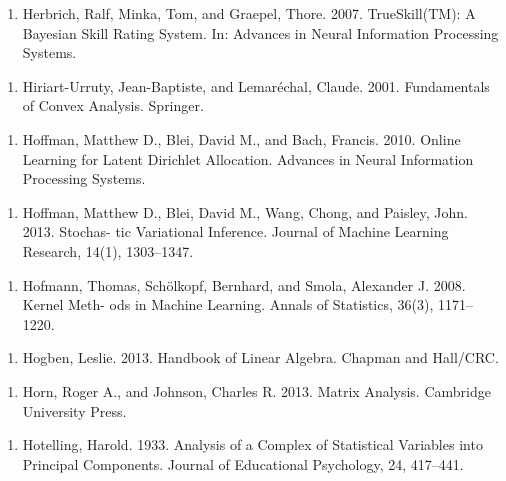 \begin{enumerate}
\item Herbrich, Ralf, Minka, Tom, and Graepel, Thore. 2007. TrueSkill(TM): A Bayesian Skill Rating System. In: Advances in Neural Information Processing Systems.
\end{enumerate}

\begin{enumerate}
\item Hiriart-Urruty, Jean-Baptiste, and Lemaréchal, Claude. 2001. Fundamentals of Convex Analysis. Springer.
\end{enumerate}

\begin{enumerate}
\item Hoffman, Matthew D., Blei, David M., and Bach, Francis. 2010. Online Learning for Latent Dirichlet Allocation. Advances in Neural Information Processing Systems.
\end{enumerate}

\begin{enumerate}
\item Hoffman, Matthew D., Blei, David M., Wang, Chong, and Paisley, John. 2013. Stochas- tic Variational Inference. Journal of Machine Learning Research, 14(1), 1303–1347.
\end{enumerate}

\begin{enumerate}
\item Hofmann, Thomas, Schölkopf, Bernhard, and Smola, Alexander J. 2008. Kernel Meth- ods in Machine Learning. Annals of Statistics, 36(3), 1171–1220.
\end{enumerate}

\begin{enumerate}
\item Hogben, Leslie. 2013. Handbook of Linear Algebra. Chapman and Hall/CRC.
\end{enumerate}

\begin{enumerate}
\item Horn, Roger A., and Johnson, Charles R. 2013. Matrix Analysis. Cambridge University Press.
\end{enumerate}

\begin{enumerate}
\item Hotelling, Harold. 1933. Analysis of a Complex of Statistical Variables into Principal Components. Journal of Educational Psychology, 24, 417–441.
\end{enumerate}


